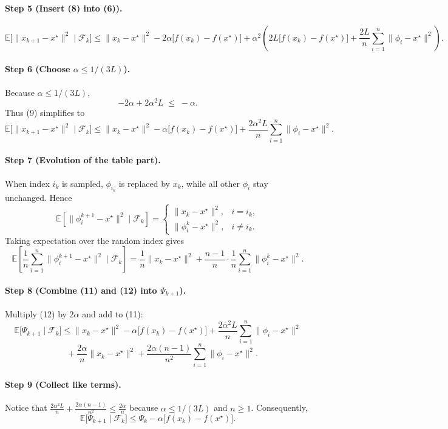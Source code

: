 \documentclass{article}
\newcommand{\E}{\mathbb{E}}
\begin{document}
\paragraph{Step 5 (Insert (8) into (6)).}
\[
\E\!\bigl[\|x_{k+1}-x^{\star}\|^{2}\mid\mathcal{F}_k\bigr]
\le
\|x_k-x^{\star}\|^{2}
-2\alpha\bigl[f(x_k)-f(x^{\star})\bigr]
+\alpha^{2}\!\left(
2L\bigl[f(x_k)-f(x^{\star})\bigr]
+\frac{2L}{n}\sum_{i=1}^{n}\|\phi_i-x^{\star}\|^{2}
\right).
\tag{9}
\]

\paragraph{Step 6 (Choose $\alpha\le 1/(3L)$).}
Because $\alpha\le 1/(3L)$,
\[
-2\alpha+2\alpha^{2}L \;\le\; -\alpha .
\tag{10}
\]
Thus (9) simplifies to
\[
\E\!\bigl[\|x_{k+1}-x^{\star}\|^{2}\mid\mathcal{F}_k\bigr]
\le
\|x_k-x^{\star}\|^{2}
-\alpha\bigl[f(x_k)-f(x^{\star})\bigr]
+\frac{2\alpha^{2}L}{n}\sum_{i=1}^{n}\|\phi_i-x^{\star}\|^{2}.
\tag{11}
\]

\paragraph{Step 7 (Evolution of the table part).}
When index $i_k$ is sampled, $\phi_{i_k}$ is replaced by $x_k$, while all other $\phi_i$ stay unchanged. Hence
\[
\E\!\left[\|\phi_{i}^{k+1}-x^{\star}\|^{2}\mid\mathcal{F}_k\right]
=
\begin{cases}
\|x_k-x^{\star}\|^{2}, & i=i_k,\\[2mm]
\|\phi_i^{k}-x^{\star}\|^{2}, & i\neq i_k .
\end{cases}
\]
Taking expectation over the random index gives
\[
\E\!\left[\frac{1}{n}\sum_{i=1}^{n}\|\phi_i^{k+1}-x^{\star}\|^{2}\mid\mathcal{F}_k\right]
=
\frac{1}{n}\|x_k-x^{\star}\|^{2}
+\frac{n-1}{n}\cdot\frac{1}{n}\sum_{i=1}^{n}\|\phi_i^{k}-x^{\star}\|^{2}.
\tag{12}
\]

\paragraph{Step 8 (Combine (11) and (12) into $\Psi_{k+1}$).}
Multiply (12) by $2\alpha$ and add to (11):
\[
\E\!\bigl[\Psi_{k+1}\mid\mathcal{F}_k\bigr]
\le
\|x_k-x^{\star}\|^{2}
-\alpha\bigl[f(x_k)-f(x^{\star})\bigr]
+\frac{2\alpha^{2}L}{n}\sum_{i=1}^{n}\|\phi_i-x^{\star}\|^{2}
\]
\[
\quad
+ \frac{2\alpha}{n}\|x_k-x^{\star}\|^{2}
+\frac{2\alpha (n-1)}{n^{2}}\sum_{i=1}^{n}\|\phi_i-x^{\star}\|^{2}.
\tag{13}
\]

\paragraph{Step 9 (Collect like terms).}
Notice that $\frac{2\alpha^{2}L}{n}+\frac{2\alpha (n-1)}{n^{2}}
\le \frac{2\alpha}{n}$ because $\alpha\le 1/(3L)$ and $n\ge1$. Consequently,
\[
\E\!\bigl[\Psi_{k+1}\mid\mathcal{F}_k\bigr]
\le
\Psi_k -\alpha\bigl[f(x_k)-f(x^{\star})\bigr].
\tag{14}
\]
\end{document}

